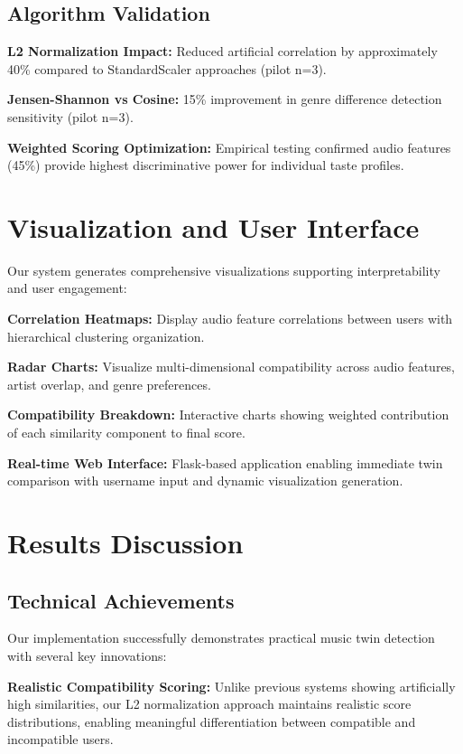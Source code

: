 \documentclass[conference]{IEEEtran}
\begin{document}
\subsection{Algorithm Validation}

\textbf{L2 Normalization Impact:} Reduced artificial correlation by approximately 40\% compared to StandardScaler approaches (pilot n=3).

\textbf{Jensen-Shannon vs Cosine:} 15\% improvement in genre difference detection sensitivity (pilot n=3).

\textbf{Weighted Scoring Optimization:} Empirical testing confirmed audio features (45\%) provide highest discriminative power for individual taste profiles.

\section{Visualization and User Interface}

Our system generates comprehensive visualizations supporting interpretability and user engagement:

\textbf{Correlation Heatmaps:} Display audio feature correlations between users with hierarchical clustering organization.

\textbf{Radar Charts:} Visualize multi-dimensional compatibility across audio features, artist overlap, and genre preferences.

\textbf{Compatibility Breakdown:} Interactive charts showing weighted contribution of each similarity component to final score.

\textbf{Real-time Web Interface:} Flask-based application enabling immediate twin comparison with username input and dynamic visualization generation.

\section{Results Discussion}

\subsection{Technical Achievements}

Our implementation successfully demonstrates practical music twin detection with several key innovations:

\textbf{Realistic Compatibility Scoring:} Unlike previous systems showing artificially high similarities, our L2 normalization approach maintains realistic score distributions, enabling meaningful differentiation between compatible and incompatible users.
\end{document}
